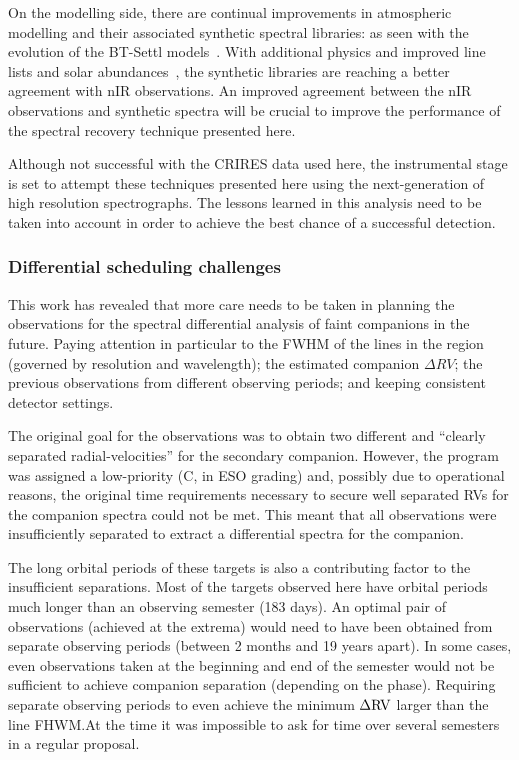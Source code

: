\documentclass[fleqn,usenatbib]{mnras}
\begin{document}
On the modelling side, there are continual improvements in atmospheric modelling and their associated synthetic spectral libraries: as seen with the evolution of the {BT-Settl} models~\citep{allard_btsettl_2013}. With additional physics and improved line lists and solar abundances~\citep[e.g.][]{asplund_chemical_2009,caffau_solar_2011}, the synthetic libraries are reaching a better agreement with nIR observations. An improved agreement between the nIR observations and synthetic spectra will be crucial to improve the performance of the spectral recovery technique presented here.

Although not successful with the CRIRES data used here, the instrumental stage is set to attempt these techniques presented here using the next-generation of high resolution spectrographs. The lessons learned in this analysis need to be taken into account in order to achieve the best chance of a successful detection.

\subsubsection{Differential scheduling challenges}
\label{subsubsec:differential-schedualing}
This work has revealed that more care needs to be taken in planning the observations for the spectral differential analysis of faint companions in the future. Paying attention in particular to the FWHM of the lines in the region (governed by resolution and wavelength); the estimated companion \(\Delta RV\); the previous observations from different observing periods; and keeping consistent detector settings.

The original goal for the observations was to obtain two different and ``clearly separated radial-velocities'' for the secondary companion. However, the program was assigned a low-priority (C, in ESO grading) and, possibly due to operational reasons, the original time requirements necessary to secure well separated RVs for the companion spectra could not be met. This meant that all observations were insufficiently separated to extract a differential spectra for the companion.

The long orbital periods of these targets is also a contributing factor to the insufficient separations. Most of the targets observed here have orbital periods much longer than an observing semester (183 days). An optimal pair of observations (achieved at the extrema) would need to have been obtained from separate observing periods (between 2 months and 19 years apart). In some cases, even observations taken at the beginning and end of the semester would not be sufficient to achieve companion separation (depending on the phase). Requiring separate observing periods to even achieve the minimum \(\Delta \rm RV\) larger than the line FHWM.\@ At the time it was impossible to ask for time over several semesters in a regular proposal.
\end{document}
